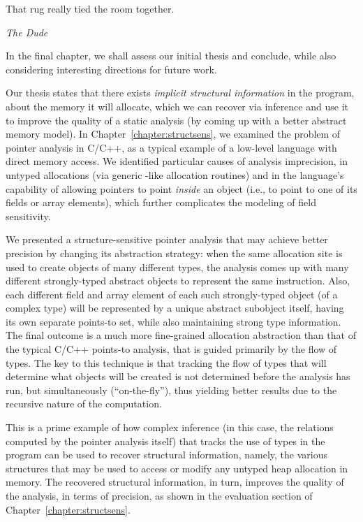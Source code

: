\label{chapter:conclusions}
\epigraph{That rug really tied the room together.}{\textit{The Dude}}

In the final chapter, we shall assess our initial thesis and conclude,
while also considering interesting directions for future work.

Our thesis states that there exists \emph{implicit structural
  information} in the program, about the memory it will allocate,
which we can recover via inference and use it to improve the quality
of a static analysis (by coming up with a better abstract memory
model). In Chapter~\ref{chapter:structsens}, we examined the problem
of pointer analysis in C/C++, as a typical example of a low-level
language with direct memory access. We identified particular causes of
analysis imprecision, in untyped allocations (via generic
-like allocation routines) and in the language's
capability of allowing pointers to point \emph{inside} an object
(i.e., to point to one of its fields or array elements), which further
complicates the modeling of field sensitivity.

We presented a structure-sensitive pointer analysis that may achieve
better precision by changing its abstraction strategy: when the same
allocation site is used to create objects of many different types, the
analysis comes up with many different strongly-typed abstract objects
to represent the same instruction. Also, each different field and
array element of each such strongly-typed object (of a complex type)
will be represented by a unique abstract subobject itself, having its
own separate points-to set, while also maintaining strong type
information. The final outcome is a much more fine-grained allocation
abstraction than that of the typical C/C++ points-to analysis, that is
guided primarily by the flow of types. The key to this technique is
that tracking the flow of types that will determine what objects will be
created is not determined before the analysis has run, but
simultaneously (``on-the-fly''), thus yielding better results due to
the recursive nature of the computation.

This is a prime example of how complex inference (in this case, the
relations computed by the pointer analysis itself) that tracks the use
of types in the program can be used to recover structural information,
namely, the various structures that may be used to access or modify
any untyped heap allocation in memory. The recovered structural
information, in turn, improves the quality of the analysis, in terms
of precision, as shown in the evaluation section of
Chapter~\ref{chapter:structsens}.

